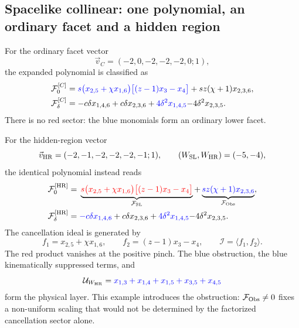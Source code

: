 \documentclass[a4paper,11pt]{article}
\newcommand{\HR}{\mathrm{HR}}
\newcommand{\FSL}{\mathcal F_{\rm SL}}
\newcommand{\FObs}{\mathcal F_{\rm Obs}}
\newcommand{\WSL}{W_{\rm SL}}
\newcommand{\WHR}{W_{\rm HR}}
\newcommand{\vHR}{\vec v_{\rm HR}}
\newcommand{\ideal}{\mathcal I}
\newcommand{\SLcolour}[1]{{\color{red}#1}}
\newcommand{\HRcolour}[1]{{\color{blue}#1}}
\newcommand{\Othercolour}[1]{{\color{black}#1}}
\begin{document}
\subsection{Spacelike collinear: one polynomial, an ordinary facet and a hidden region}

For the ordinary facet vector
\begin{equation}
 \vec v_C=(-2,0,-2,-2,-2,0;1),
 \label{eq:five-facet-vector}
\end{equation}
the expanded polynomial is classified as
\begin{align}
 \mathcal F_0^{[C]}={}&
 \HRcolour{s\bigl(x_{2,5}+\chi x_{1,6}\bigr)
       \bigl[(z-1)x_3-x_4\bigr]}
 +\Othercolour{sz(\chi+1)x_{2,3,6}},
 \label{eq:five-facet-F0}\\
 \mathcal F_\delta^{[C]}={}&
 \Othercolour{-c\delta x_{1,4,6}+c\delta x_{2,3,6}}
 +\HRcolour{4\delta^2x_{1,4,5}}
 \Othercolour{-4\delta^2x_{2,3,5}}.
 \label{eq:five-facet-Fdelta}
\end{align}
There is no red sector: the blue monomials form an ordinary lower facet.

For the hidden-region vector
\begin{equation}
 \vHR=(-2,-1,-2,-2,-2,-1;1),
 \qquad (\WSL,\WHR)=(-5,-4),
 \label{eq:five-HR-vector}
\end{equation}
the identical polynomial instead reads
\begin{align}
 \mathcal F_0^{[\HR]}={}&
 \underbrace{\SLcolour{s\bigl(x_{2,5}+\chi x_{1,6}\bigr)
       \bigl[(z-1)x_3-x_4\bigr]}}_{\FSL}
 +\underbrace{\HRcolour{sz(\chi+1)x_{2,3,6}}}_{\FObs},
 \label{eq:five-HR-F0}\\
 \mathcal F_\delta^{[\HR]}={}&
 \HRcolour{-c\delta x_{1,4,6}}
 +\Othercolour{c\delta x_{2,3,6}}
 +\HRcolour{4\delta^2x_{1,4,5}}
 \Othercolour{-4\delta^2x_{2,3,5}}.
 \label{eq:five-HR-Fdelta}
\end{align}
The cancellation ideal is generated by
\begin{equation}
 f_1=x_{2,5}+\chi x_{1,6},\qquad
 f_2=(z-1)x_3-x_4,\qquad \ideal=\langle f_1,f_2\rangle.
 \label{eq:five-generator}
\end{equation}
The red product vanishes at the positive pinch.  The blue obstruction,
the blue kinematically suppressed terms, and
\begin{equation}
 \mathcal U_{\WHR}
 =\HRcolour{x_{1,3}+x_{1,4}+x_{1,5}+x_{3,5}+x_{4,5}}
 \label{eq:five-U-leading}
\end{equation}
form the physical layer.  This example introduces the obstruction:
\(\FObs\ne0\) fixes a non-uniform scaling that would not be determined by
the factorized cancellation sector alone.
\end{document}
